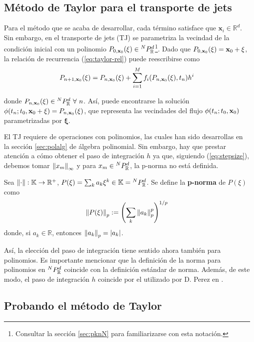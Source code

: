 \subsection{Método de Taylor para el transporte de jets}
Para el método que se acaba de desarrollar, cada término satisface que $\mathbf{x}_i \in \mathbb{R}^d$. Sin embargo, en el transporte de jets (TJ) se parametriza la vecindad de la condición inicial con un polinomio $P_{0,\mathbf{x}_0}(\mathbf{\xi}) \in {^{N}P_{\mathbb{R}}^ d }$\footnote{Consultar la sección \ref{sec:pknN} para familiarizarse con esta notación.}. Dado que $P_{0,\mathbf{x}_0}(\mathbf{\xi}) = \mathbf{x}_0 + \mathbf{\xi}$, la relación de recurrencia (\ref{eq:taylor-rel}) puede reescribirse como
\begin{equation}
P_{n+1,\mathbf{x}_0}(\xi) = P_{n,\mathbf{x}_0}(\xi) + \sum_{i=1}^M f_i(P_{n,\mathbf{x}_0}(\xi),t_n)h^i 
\label{eq:jt-rel}
\end{equation}

donde $P_{n,\xo}(\xi) \in \pkk{N}{d} \ \forall \ n$. Así, puede encontrarse la solución $\phi(t_n;t_0,\mathbf{x}_0 + \mathbf{\xi}) = P_{n,\mathbf{x}_0}(\xi)$, que representa las vecindades del flujo $\phi(t_n;t_0,\mathbf{x}_0)$ parametrizadas por $\mathbf{\xi}$.

El TJ requiere de operaciones con polinomios, las cuales han sido desarrollas en la sección \ref{sec:polalg} de álgebra polinomial. Sin embargo, hay que prestar atención a cómo obtener el paso de integración $h$ ya que, siguiendo (\ref{eq:stepsize}), debemos tomar $\left\lVert x_m\right\rVert_\infty$ y para $x_m \in {^{N}P_{\mathbb{R}}^ d }$, la p-norma no está definida.

\begin{definicion}
Sea $\left\lVert\cdot\right\rVert : \mathbb{K} \to \mathbb{R}^+$, $P(\mathbf{\xi}) = \sum_{k} a_k \mathbf{\xi}^k \in \mathbb{K} = {^{N}P_{\mathbb{R}}^ d }$. Se define la \textbf{p-norma} de $P(\xi)$ como
\begin{equation}
 \left\lVert P(\mathbf{\xi})\right\rVert_p := \left( \sum_{k} \left\lVert a_k\right\rVert_p^p \right)^{1/p}
 \label{eq:poly-norm}
\end{equation}  
donde, si $a_k \in \mathbb{R}$, entonces $\left\lVert a_k\right\rVert_p = |a_k|$.
\end{definicion}

Así, la elección del paso de integración tiene sentido ahora también para polinomios. Es importante mencionar que la definición de la norma para polinomios en ${^{N}P_{\mathbb{R}}^ d }$ coincide con la definición estándar de norma. Además, de este modo, el paso de integración $h$ coincide por el utilizado por D. Perez en \cite{P-palau}.

\subsection{Probando el método de Taylor}
\label{sec:benchmark-taylor}

